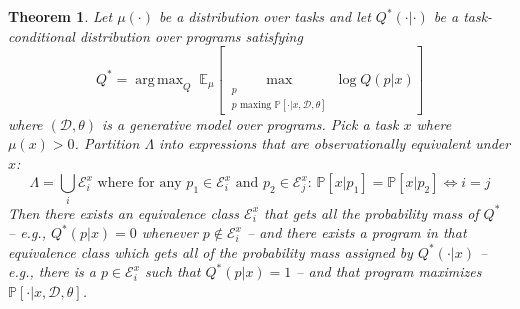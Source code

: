 \documentclass{article}
\DeclareMathOperator*{\argmax}{arg\,max} %
\newcommand{\expect}{\mathds{E}} %
\newcommand{\probability}{\mathds{P}} %
\newtheorem{theorem}{Theorem}
\begin{document}
 \pagebreak\begin{theorem}\label{symmetricproof}
   Let $\mu(\cdot )$ be a distribution over tasks and let $Q^*(\cdot |\cdot )$ be a task-conditional distribution over programs satisfying
   $$
   Q^* = \argmax_Q\;\expect_\mu\left[\max_{\substack{p\\p\text{ maxing }\probability[\cdot |x,\mathcal{D},\theta]}}\log  Q(p|x) \right]
   $$
   where $(\mathcal{D},\theta)$ is a generative model over programs. Pick a task $x$ where $\mu(x) > 0$.
Partition $\Lambda$ into expressions that are observationally equivalent under $x$:
   $$
\Lambda = \bigcup_i \mathcal{E}^x_i\text{ where for any }p_1\in \mathcal{E}^x_i\text{ and }p_2\in \mathcal{E}^x_j\text{: }\probability[x|p_1] = \probability[x|p_2] \iff i = j
$$
Then there exists an equivalence class $\mathcal{E}^x_i$
that gets all the probability mass of $Q^*$ -- e.g.,
$Q^*(p|x) = 0$ whenever $p\not\in \mathcal{E}^x_i$ --
and there exists a program in that equivalence class
which gets all of the probability mass assigned by $Q^*(\cdot |x)$ -- e.g.,  there is a $p\in \mathcal{E}^x_i$
such that $Q^*(p|x) = 1$ -- and that program maximizes $\probability[\cdot |x,\mathcal{D},\theta ]$.
 \end{theorem}
\end{document}
